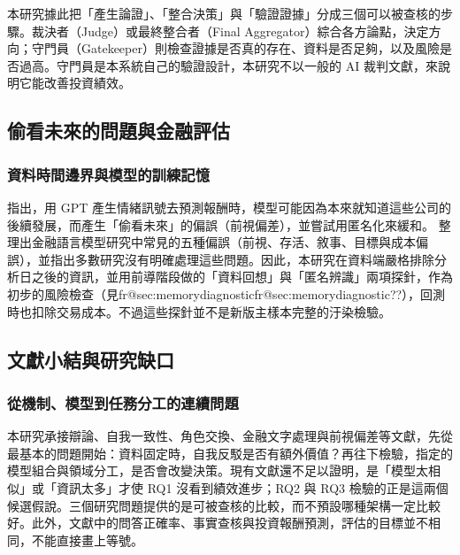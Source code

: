 \documentclass[12pt,a4paper]{article}
\makeatletter
\numberwithin{table}{section}
\numberwithin{figure}{section}
\newcommand{\frref}[1]{\ifcsname fr@#1\endcsname\csname fr@#1\endcsname\else ??\fi}
\makeatother
\begin{document}
本研究據此把「產生論證」、「整合決策」與「驗證證據」分成三個可以被查核的步驟。裁決者（Judge）或最終整合者（Final Aggregator）綜合各方論點，決定方向；守門員（Gatekeeper）則檢查證據是否真的存在、資料是否足夠，以及風險是否過高。守門員是本系統自己的驗證設計，本研究不以一般的 AI 裁判文獻，來說明它能改善投資績效。

\subsection{偷看未來的問題與金融評估}

\subsubsection{資料時間邊界與模型的訓練記憶}
\citet{glasserman2023lookahead} 指出，用 GPT 產生情緒訊號去預測報酬時，模型可能因為本來就知道這些公司的後續發展，而產生「偷看未來」的偏誤（前視偏差），並嘗試用匿名化來緩和。\citet{kong2026bias} 整理出金融語言模型研究中常見的五種偏誤（前視、存活、敘事、目標與成本偏誤），並指出多數研究沒有明確處理這些問題。因此，本研究在資料端嚴格排除分析日之後的資訊，並用前導階段做的「資料回想」與「匿名辨識」兩項探針，作為初步的風險檢查（見\frref{sec:memorydiagnostic}），回測時也扣除交易成本。不過這些探針並不是新版主樣本完整的汙染檢驗。
\subsection{文獻小結與研究缺口}

\subsubsection{從機制、模型到任務分工的連續問題}

本研究承接辯論、自我一致性、角色交換、金融文字處理與前視偏差等文獻，先從最基本的問題開始：資料固定時，自我反駁是否有額外價值？再往下檢驗，指定的模型組合與領域分工，是否會改變決策。現有文獻還不足以證明，是「模型太相似」或「資訊太多」才使 RQ1 沒看到績效進步；RQ2 與 RQ3 檢驗的正是這兩個候選假說。三個研究問題提供的是可被查核的比較，而不預設哪種架構一定比較好。此外，文獻中的問答正確率、事實查核與投資報酬預測，評估的目標並不相同，不能直接畫上等號。
\end{document}
